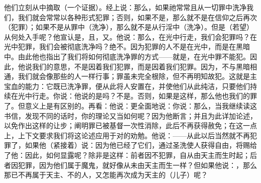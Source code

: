 他们立刻从中摘取（一个证据）。经上说：那么，如果祂常常且从一切罪中洗净我们，我们就会常常以各种形式犯罪；否则，如果不是，那么就不是在信仰之后再次（犯罪）；如果不是从罪中（洗净），那么就不是从行淫中（洗净）。但是（若望）从何处入手呢？他宣认是，且，又。他说：那么，在光中行走，我们会犯罪吗？在光中犯罪，我们会被彻底洗净吗？绝不。因为犯罪的人不是在光中，而是在黑暗中。由此他也指出了我们将如何彻底洗净罪的方式——就是，在光中罪不能犯。因此，他说我们的意思，不是因着我们犯罪，而是因着我们犯罪。因为，不与黑暗相通，我们就会像那些的人一样行事；罪虽未完全根除，但不再明知故犯。这就是主宝血的能力：它既已洗净罪，便从此将人安置在，并使他们从此纯洁，只要他们持续在光中行走。你说：他说的是吗？不是。否则，如果是这样，那么他也我们的罪了。但意义上是有区别的。再看：他说：更全面地说：你说：那么，当我继续读这书信，发现不同的话时，你的理论又当如何呢？因为他断言；并且为此详加论述，以免作出这样的让步；阐明罪已被基督一次性消除，此后不再获得赦免；在这一点上，上下文要求我们将这论述应用于对的劝勉。他说：——从此以后当然就不再犯罪了，如果他（紧接着）说：因为他已经了它们，通过圣洗使人获得自由，将赐给了他：因此，如何显露呢？除非是这样：前者因不犯罪，自从由天主而生时起；后者因犯罪，因为他们属于魔鬼，就好像从未由天主而生一样？但如果他说：，那么那已不再属于天主、不的人，又怎能再次成为天主的（儿子）呢？\par

